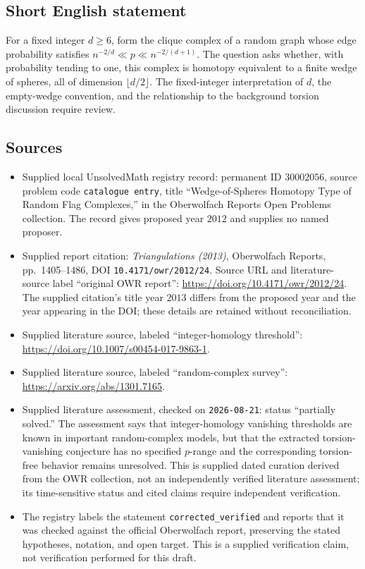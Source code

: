 \documentclass[11pt]{article}
\begin{document}
\subsection{Short English statement}
For a fixed integer \(d\geq6\), form the clique complex of a random graph whose edge probability satisfies \(n^{-2/d}\ll p\ll n^{-2/(d+1)}\). The question asks whether, with probability tending to one, this complex is homotopy equivalent to a finite wedge of spheres, all of dimension \(\lfloor d/2\rfloor\). The fixed-integer interpretation of \(d\), the empty-wedge convention, and the relationship to the background torsion discussion require review.
\subsection{Sources}
\begin{itemize}
\item Supplied local UnsolvedMath registry record: permanent ID \(30002056\), source problem code \texttt{catalogue entry}, title ``Wedge-of-Spheres Homotopy Type of Random Flag Complexes,'' in the Oberwolfach Reports Open Problems collection. The record gives proposed year \(2012\) and supplies no named proposer.
\item Supplied report citation: \emph{Triangulations (2013)}, Oberwolfach Reports, pp.~1405--1486, DOI \texttt{10.4171/owr/2012/24}. Source URL and literature-source label ``original OWR report'': \url{https://doi.org/10.4171/owr/2012/24}. The supplied citation's title year \(2013\) differs from the proposed year and the year appearing in the DOI; these details are retained without reconciliation.
\item Supplied literature source, labeled ``integer-homology threshold'': \url{https://doi.org/10.1007/s00454-017-9863-1}.
\item Supplied literature source, labeled ``random-complex survey'': \url{https://arxiv.org/abs/1301.7165}.
\item Supplied literature assessment, checked on \texttt{2026-08-21}: status ``partially solved.'' The assessment says that integer-homology vanishing thresholds are known in important random-complex models, but that the extracted torsion-vanishing conjecture has no specified \(p\)-range and the corresponding torsion-free behavior remains unresolved. This is supplied dated curation derived from the OWR collection, not an independently verified literature assessment; its time-sensitive status and cited claims require independent verification.
\item The registry labels the statement \texttt{corrected\_verified} and reports that it was checked against the official Oberwolfach report, preserving the stated hypotheses, notation, and open target. This is a supplied verification claim, not verification performed for this draft.
\end{itemize}
\end{document}
